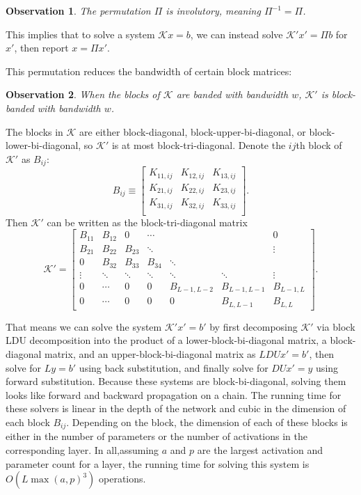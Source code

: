 \documentclass{article}
\newcommand{\K}{\mathcal{K}}
\newtheorem{observation}{Observation}
\begin{document}
\begin{observation}
  The permutation $\Pi$ is involutory, meaning $\Pi^{-1} =\Pi$.
\end{observation}

This implies that  to solve a system $\K x = b$, we can instead solve $\K' x' =
  \Pi b$ for $x'$, then report $x = \Pi x'$.

This permutation reduces the bandwidth of certain block matrices:

\begin{observation} When the blocks of $\K$ are banded with bandwidth $w$, $\K'$
  is block-banded with bandwidth $w$.
\end{observation}

The blocks in $\K$ are either block-diagonal, block-upper-bi-diagonal, or
block-lower-bi-diagonal, so $\K'$ is at most block-tri-diagonal. Denote the
$ij$th block of $\K'$ as $B_{ij}$:
\[
  B_{ij} \equiv \begin{bmatrix}
    K_{11,ij} & K_{12,ij} & K_{13,ij} \\
    K_{21,ij} & K_{22,ij} & K_{23,ij} \\
    K_{31,ij} & K_{32,ij} & K_{33,ij} \\
  \end{bmatrix}.
\]
Then $\K'$ can be written as the block-tri-diagonal matrix
\begin{equation}
  \label{eq:K-pivoted}
  \K' = \begin{bmatrix}
    B_{11} & B_{12} & 0      & \cdots &              &              & 0          \\
    B_{21} & B_{22} & B_{23} & \ddots &              &              & \vdots     \\
    0      & B_{32} & B_{33} & B_{34} & \ddots       &              &            \\
    \vdots & \ddots & \ddots & \ddots & \ddots       & \ddots       & \vdots     \\
    0      & \cdots & 0      & 0      & B_{L-1, L-2} & B_{L-1, L-1} & B_{L-1, L} \\
    0      & \cdots & 0      & 0      & 0            & B_{L, L-1}   & B_{L, L}
  \end{bmatrix}.
\end{equation}

That means we can solve the system $\K'x'=b'$ by first decomposing $\K'$ via
block LDU decomposition into the product of a lower-block-bi-diagonal matrix, a
block-diagonal matrix, and an upper-block-bi-diagonal matrix as $LDU x'=b'$,
then solve for $L y = b'$  using back substitution, and finally solve for
$DUx'=y$ using forward substitution. Because these systems are
block-bi-diagonal, solving them looks like forward and backward propagation on a
chain. The running time for these solvers is linear in the depth of the network
and cubic in the dimension of each block $B_{ij}$. Depending on the block, the
dimension of each of these blocks is either in the number of parameters or the
number of activations in the corresponding layer. In all,assuming $a$ and $p$
are the largest activation and parameter count for a layer, the running time
for solving this system is $O\left(L \max(a, p)^3\right)$ operations.
\end{document}

